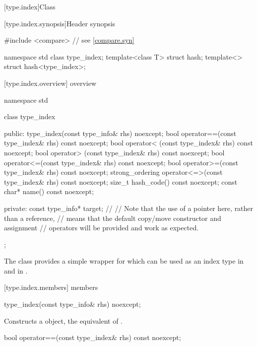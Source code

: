 [type.index]{Class }

[type.index.synopsis]{Header  synopsis}

%
\begin{codeblock}
#include <compare>              // see \ref{compare.syn}

namespace std {
  class type_index;
  template<class T> struct hash;
  template<> struct hash<type_index>;
}
\end{codeblock}

[type.index.overview]{ overview}

%
\begin{codeblock}
namespace std {
  class type_index {
  public:
    type_index(const type_info& rhs) noexcept;
    bool operator==(const type_index& rhs) const noexcept;
    bool operator< (const type_index& rhs) const noexcept;
    bool operator> (const type_index& rhs) const noexcept;
    bool operator<=(const type_index& rhs) const noexcept;
    bool operator>=(const type_index& rhs) const noexcept;
    strong_ordering operator<=>(const type_index& rhs) const noexcept;
    size_t hash_code() const noexcept;
    const char* name() const noexcept;

  private:
    const type_info* target;    // \expos
    // Note that the use of a pointer here, rather than a reference,
    // means that the default copy/move constructor and assignment
    // operators will be provided and work as expected.
  };
}
\end{codeblock}

\pnum
The class  provides a simple wrapper for
 which can be used as an index type in
 and in
.

[type.index.members]{ members}

%
\begin{itemdecl}
type_index(const type_info& rhs) noexcept;
\end{itemdecl}

\begin{itemdescr}
\pnum
\effects
Constructs a  object, the equivalent of .
\end{itemdescr}

%
\begin{itemdecl}
bool operator==(const type_index& rhs) const noexcept;
\end{itemdecl}

